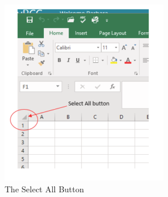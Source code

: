 \begin{figure}[H]
	\centering
	\includegraphics[width=\maxwidth{.95\linewidth}]{gfx/ch01_fig53}
	\caption{The Select All Button}
	\label{01:fig53}
\end{figure}

